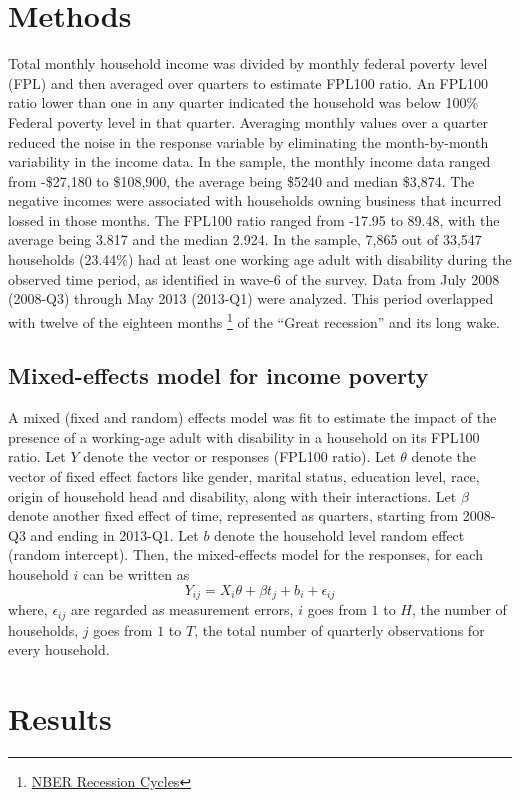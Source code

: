 \documentclass[11pt]{extarticle} %
\begin{document}
\section{Methods}
Total monthly household income was divided by monthly federal poverty level (FPL) and then averaged over quarters to estimate FPL100 ratio. An FPL100 ratio lower than one in any quarter indicated the household was below 100\% Federal poverty level in that quarter. Averaging monthly values over a quarter reduced the noise in the response variable by eliminating the month-by-month variability in the income data. In the sample, the monthly income data ranged from -\$27,180 to \$108,900, the average being \$5240 and median \$3,874. The negative incomes were associated with households owning business that incurred lossed in those months. The FPL100 ratio ranged from -17.95 to 89.48, with the average being 3.817 and the median 2.924. In the sample, 7,865 out of 33,547 households (23.44\%) had at least one working age adult with disability during the observed time period, as identified in wave-6 of the survey. Data from July 2008 (2008-Q3) through May 2013 (2013-Q1) were analyzed. This period overlapped with twelve of the eighteen months {\footnote{\href{http://www.nber.org/cycles/}{NBER Recession Cycles}}} of the ``Great recession'' and its long wake. 

\subsection{Mixed-effects model for income poverty}
A mixed (fixed and random) effects model was fit to estimate the impact of the presence of a working-age adult with disability in a household on its FPL100 ratio. Let $Y$ denote the vector or responses (FPL100 ratio). Let $\theta$ denote the vector of fixed effect factors like gender, marital status, education level, race, origin of household head and disability, along with their interactions. Let $\beta$ denote another fixed effect of time, represented as quarters, starting from 2008-Q3 and ending in 2013-Q1. Let $b$ denote the household level random effect (random intercept). Then, the mixed-effects \cite{Fitzmaurice_2012_Applied} model for the responses, for each household $i$ can be written as
\begin{equation}
Y_{ij} = X_i\theta + \beta t_j + b_i + \epsilon_{ij}
\end{equation}
where, $\epsilon_{ij}$ are regarded as measurement errors, $i$ goes from $1$ to $H$, the number of households, $j$ goes from $1$ to $T$, the total number of quarterly observations for every household. 
 
\section{Results}


\newpage

\end{document}
